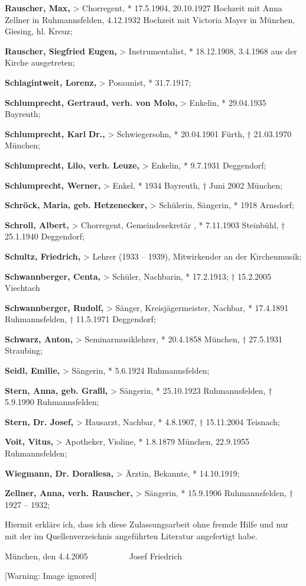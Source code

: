 \documentclass[a4paper]{article}
\begin{document}
\textbf{Rauscher, Max,} {\textgreater} Chorregent, * 17.5.1904,
20.10.1927 Hochzeit mit Anna Zellner in Ruhmannsfelden, 4.12.1932
Hochzeit mit Victoria Mayer in München, Giesing, hl. Kreuz;

\textbf{Rauscher, Siegfried Eugen,} {\textgreater} Instrumentalist, *
18.12.1908, 3.4.1968 aus der Kirche ausgetreten;

\textbf{Schlagintweit, Lorenz,} {\textgreater} Posaunist, * 31.7.1917;

\textbf{Schlumprecht, Gertraud, verh. von Molo,} {\textgreater} Enkelin,
* 29.04.1935 Bayreuth;

\textbf{Schlumprecht, Karl} \textbf{Dr.,} {\textgreater} Schwiegersohn,
* 20.04.1901 Fürth, † 21.03.1970 München;

\textbf{Schlumprecht, Lilo, verh. Leuze,} {\textgreater} Enkelin, *
9.7.1931 Deggendorf;

\textbf{Schlumprecht, Werner,} {\textgreater} Enkel, * 1934 Bayreuth, †
Juni 2002 München;

\textbf{Schröck, Maria, geb. Hetzenecker,} {\textgreater} Schülerin,
Sängerin, * 1918 Arnsdorf;

\textbf{Schroll, Albert, }{\textgreater} Chorregent, Gemeindesekretär
,\textbf{ }* 7.11.1903 Steinbühl,  † 25.1.1940 Deggendorf;

\textbf{Schultz, Friedrich,} {\textgreater} Lehrer (1933 – 1939),
Mitwirkender an der Kirchenmusik;

\textbf{Schwannberger, Centa,} {\textgreater} Schüler, Nachbarin, *
17.2.1913; † 15.2.2005 Viechtach

\textbf{Schwannberger, Rudolf,} {\textgreater} Sänger,
Kreisjägermeister, Nachbar, * 17.4.1891 Ruhmannsfelden, † 11.5.1971
Deggendorf;

\textbf{Schwarz, Anton,} {\textgreater} Seminarmusiklehrer, * 20.4.1858
München, † 27.5.1931 Straubing;

\textbf{Seidl, Emilie,} {\textgreater} Sängerin, * 5.6.1924
Ruhmannsfelden;

\textbf{Stern, Anna, geb. Graßl,} {\textgreater} Sängerin, * 25.10.1923
Ruhmannsfelden, † 5.9.1990 Ruhmannsfelden;

\textbf{Stern, Dr. Josef,} {\textgreater} Hausarzt, Nachbar, * 4.8.1907,
† 15.11.2004 Teisnach;

\textbf{Voit, Vitus,} {\textgreater} Apotheker, Violine, * 1.8.1879
München, 22.9.1955 Ruhmannsfelden;

\textbf{Wiegmann, Dr. Doraliesa,} {\textgreater} Ärztin, Bekannte, *
14.10.1919;

\textbf{Zellner, Anna, verh. Rauscher,} {\textgreater} Sängerin, *
15.9.1906 Ruhmannsfelden, † 1927 – 1932;


Hiermit erkläre ich, dass ich diese Zulassungsarbeit ohne fremde Hilfe
und nur mit der im Quellenverzeichnis angeführten Literatur angefertigt
habe. 

München, den 4.4.2005\ \ \ \ \ \ \ \ \ \ Josef Friedrich

  [Warning: Image ignored] %
 
\end{document}
